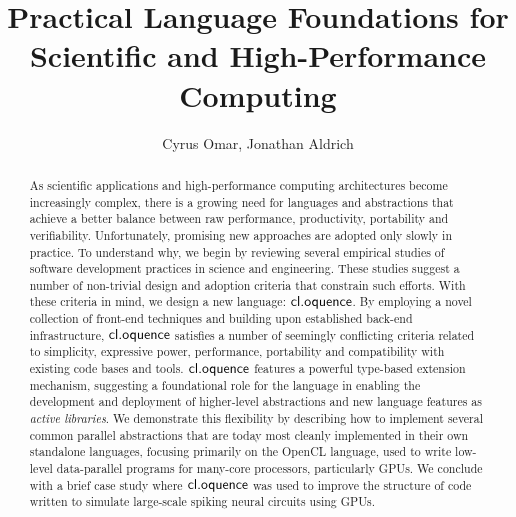 \documentclass{llncs}
\begin{document}
%
\frontmatter          %
%
\pagestyle{headings}  %
%
\mainmatter              %
%
\title{Practical Language Foundations for Scientific and High-Performance Computing}
%
%
\author{Cyrus Omar, Jonathan Aldrich}
%
%
%

\maketitle              %

\begin{abstract}
As scientific applications and high-performance computing architectures\- become increasingly complex, there is a growing need for languages and abstractions that achieve a better balance between raw performance,  productivity, portability and verifiability. Unfortunately, promising new approaches are adopted only slowly in practice. To understand why, we begin by reviewing several empirical studies of software development practices in  science and engineering. These studies suggest a number of non-trivial design and adoption criteria that constrain such efforts. 
With these criteria in mind, we design a new language: $\textsf{cl.oquence}$. By employing a novel collection of front-end techniques and building upon established back-end infrastructure, $\textsf{cl.oquence}$ satisfies  a number of seemingly conflicting criteria related to simplicity, expressive\- power, performance, portability and compatibility with existing code bases and tools. $\textsf{cl.oquence}$ features a powerful type-based extension mechanism, suggesting a foundational role for the language in enabling the development and deployment of higher-level abstractions and new language features as {\it active libraries}. We demonstrate this flexibility by describing how to implement several common parallel abstractions that are today most cleanly implemented in their own standalone languages, focusing primarily on the OpenCL language, used to write low-level data-parallel programs for many-core processors, particularly GPUs. We conclude with a brief case study where $\textsf{cl.oquence}$ was used to improve the structure of code written to simulate large-scale spiking neural circuits using GPUs.
\end{abstract}
%
\end{document}
